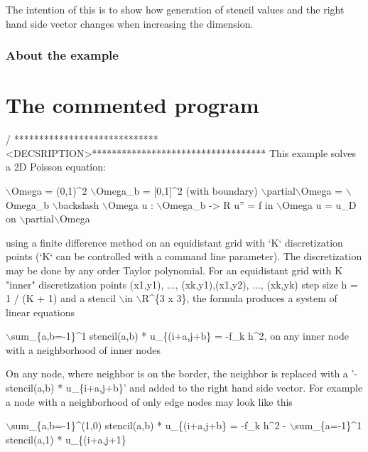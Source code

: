 The intention of this is to show how generation of stencil values and the right hand side vector changes when increasing the dimension.

\label{_Abouttheexample}%
\subsubsection*{About the example }

\label{_CommProg}%
 \section*{The commented program}


\begin{DoxyCode}
/ *****************************<DECSRIPTION>***********************************
This example solves a 2D Poisson equation:

    \(\backslash\)Omega = (0,1)^2
    \(\backslash\)Omega\_b = [0,1]^2   (with boundary)
    \(\backslash\)partial\(\backslash\)Omega = \(\backslash\)Omega\_b \(\backslash\)backslash \(\backslash\)Omega
    u : \(\backslash\)Omega\_b -> R
    u\textcolor{stringliteral}{''} = f in \(\backslash\)Omega
    u = u\_D on \(\backslash\)partial\(\backslash\)Omega

\textcolor{keyword}{using} a finite difference method on an equidistant grid with `K` discretization
points (`K` can be controlled with a command line parameter). The discretization
may be done by any order Taylor polynomial.
For an equidistant grid with K \textcolor{stringliteral}{"inner"} discretization points (x1,y1), ...,
(xk,y1),(x1,y2), ..., (xk,yk) step size h = 1 / (K + 1) and a stencil \(\backslash\)in
\(\backslash\)R^\{3 x 3\}, the formula produces a system of linear equations

\(\backslash\)sum\_\{a,b=-1\}^1 stencil(a,b) * u\_\{(i+a,j+b\} = -f\_k h^2,  on any inner node with
a neighborhood of inner nodes

On any node, where neighbor is on the border, the neighbor is replaced with a
\textcolor{stringliteral}{'-stencil(a,b) * u\_\{i+a,j+b\}'} and added to the right hand side vector. For
example a node with a neighborhood of only edge nodes may look like this

\(\backslash\)sum\_\{a,b=-1\}^(1,0) stencil(a,b) * u\_\{(i+a,j+b\} = -f\_k h^2 - \(\backslash\)sum\_\{a=-1\}^1
stencil(a,1) * u\_\{(i+a,j+1\}


\end{DoxyCode}
